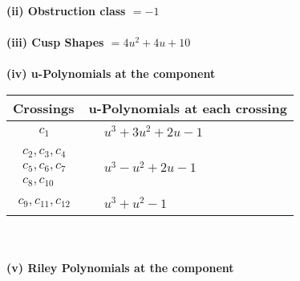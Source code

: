 \documentclass[1p]{elsarticle_modified}
\theoremstyle{definition}
\begin{document}
\flushleft \textbf{(ii) Obstruction class $= -1$}\\~\\
\flushleft \textbf{(iii) Cusp Shapes $= 4 u^2+4 u+10$}\\~\\
\newpage\renewcommand{\arraystretch}{1}
\flushleft \textbf{(iv) u-Polynomials at the component}\newline \\
\begin{tabular}{m{50pt}|m{274pt}}
Crossings & \hspace{64pt}u-Polynomials at each crossing \\
\hline $$\begin{aligned}c_{1}\end{aligned}$$&$\begin{aligned}
&u^3+3 u^2+2 u-1
\end{aligned}$\\
\hline $$\begin{aligned}c_{2},c_{3},c_{4}\\c_{5},c_{6},c_{7}\\c_{8},c_{10}\end{aligned}$$&$\begin{aligned}
&u^3- u^2+2 u-1
\end{aligned}$\\
\hline $$\begin{aligned}c_{9},c_{11},c_{12}\end{aligned}$$&$\begin{aligned}
&u^3+u^2-1
\end{aligned}$\\
\hline
\end{tabular}\\~\\
\newpage\renewcommand{\arraystretch}{1}
\flushleft \textbf{(v) Riley Polynomials at the component}\newline \\
\end{document}
